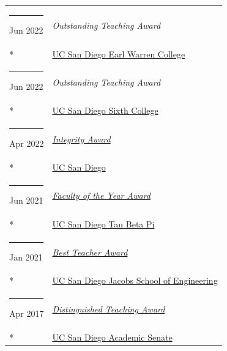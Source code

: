 \documentclass[margin,line]{res}
\begin{document}
\begin{resume}
\begin{longtable}{@{}p{0.7in}p{4in}}
\hspace*{-4mm} \rule{-1mm}{5mm} Jun 2022 & \textit{Outstanding Teaching Award}\\*
\hspace*{-4mm} \hspace*{-4mm} & \hspace{4mm} \href{https://warren.ucsd.edu/}{UC San Diego Earl Warren College}\\
\hspace*{-4mm} \rule{-1mm}{5mm} Jun 2022 & \textit{Outstanding Teaching Award}\\*
\hspace*{-4mm} \hspace*{-4mm} & \hspace{4mm} \href{https://sixth.ucsd.edu/}{UC San Diego Sixth College}\\
\hspace*{-4mm} \rule{-1mm}{5mm} Apr 2022 & \href{https://academicintegrity.ucsd.edu/events/integrity-awards/index.html}{\textit{Integrity Award}}\\*
\hspace*{-4mm} \hspace*{-4mm} & \hspace{4mm} \href{https://www.ucsd.edu/}{UC San Diego}\\
\hspace*{-4mm} \rule{-1mm}{5mm} Jun 2021 & \href{https://tbp.ucsd.edu/home}{\textit{Faculty of the Year Award}}\\*
\hspace*{-4mm} \hspace*{-4mm} & \hspace{4mm} \href{https://tbp.ucsd.edu/home}{UC San Diego Tau Beta Pi}\\
\hspace*{-4mm} \rule{-1mm}{5mm} Jan 2021 & \href{https://jacobsschool.ucsd.edu/faculty/best-teacher-awards}{\textit{Best Teacher Award}}\\*
\hspace*{-4mm} \hspace*{-4mm} & \hspace{4mm} \href{https://jacobsschool.ucsd.edu/}{UC San Diego Jacobs School of Engineering}\\
\hspace*{-4mm} \rule{-1mm}{5mm} Apr 2017 & \href{https://senate.ucsd.edu/grants-awards/senate-awards/distinguished-teaching-award/recipient-history}{\textit{Distinguished Teaching Award}}\\*
\hspace*{-4mm} \hspace*{-4mm} & \hspace{4mm} \href{https://senate.ucsd.edu/}{UC San Diego Academic Senate}\\

\end{longtable}
\end{resume}
\end{document}
